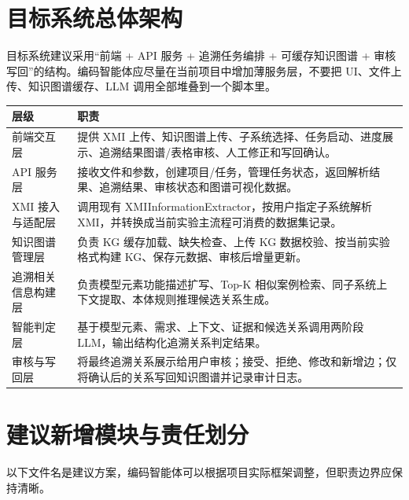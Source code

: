 \documentclass[11pt,a4paper]{article}
\begin{document}
\section{目标系统总体架构}

目标系统建议采用“前端 + API 服务 + 追溯任务编排 + 可缓存知识图谱 + 审核写回”的结构。编码智能体应尽量在当前项目中增加薄服务层，不要把 UI、文件上传、知识图谱缓存、LLM 调用全部堆叠到一个脚本里。

\begin{longtable}{p{}p{}}
\toprule
\textbf{层级} & \textbf{职责} \\
\midrule
前端交互层 & 提供 XMI 上传、知识图谱上传、子系统选择、任务启动、进度展示、追溯结果图谱/表格审核、人工修正和写回确认。 \\
API 服务层 & 接收文件和参数，创建项目/任务，管理任务状态，返回解析结果、追溯结果、审核状态和图谱可视化数据。 \\
XMI 接入与适配层 & 调用现有 XMIInformationExtractor，按用户指定子系统解析 XMI，并转换成当前实验主流程可消费的数据集记录。 \\
知识图谱管理层 & 负责 KG 缓存加载、缺失检查、上传 KG 数据校验、按当前实验格式构建 KG、保存元数据、审核后增量更新。 \\
追溯相关信息构建层 & 负责模型元素功能描述扩写、Top-K 相似案例检索、同子系统上下文提取、本体规则推理候选关系生成。 \\
智能判定层 & 基于模型元素、需求、上下文、证据和候选关系调用两阶段 LLM，输出结构化追溯关系判定结果。 \\
审核与写回层 & 将最终追溯关系展示给用户审核；接受、拒绝、修改和新增边；仅将确认后的关系写回知识图谱并记录审计日志。 \\
\bottomrule
\end{longtable}

\section{建议新增模块与责任划分}

以下文件名是建议方案，编码智能体可以根据项目实际框架调整，但职责边界应保持清晰。
\end{document}
